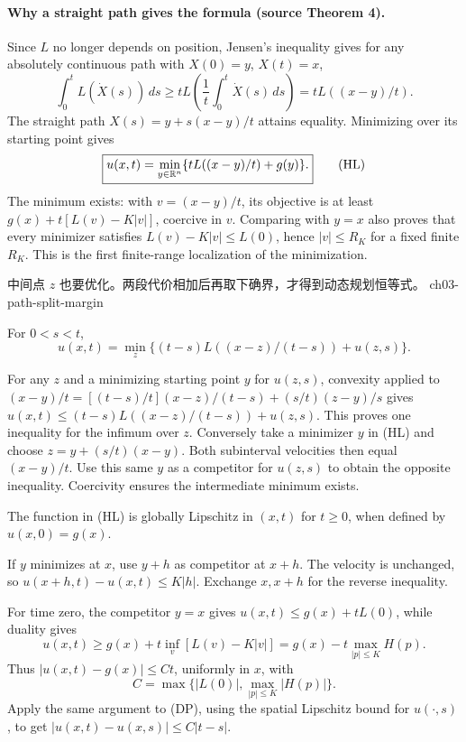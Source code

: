 \paragraph{Why a straight path gives the formula (source Theorem 4).}
Since $L$ no longer depends on position, Jensen's inequality gives
for any absolutely continuous path with $X(0)=y$, $X(t)=x$,
\[
 \int_0^tL(\dot X(s))\,ds
 \geq tL\left(\frac1t\int_0^t\dot X(s)\,ds\right)
 =tL((x-y)/t).
\]
The straight path $X(s)=y+s(x-y)/t$ attains equality.
Minimizing over its starting point gives
\[
 \boxed{u(x,t)=\min_{y\in\mathbb{R}^n}
             \{tL((x-y)/t)+g(y)\}.}
 \tag{HL}
\]
The minimum exists: with $v=(x-y)/t$, its objective is at least
$g(x)+t[L(v)-K|v|]$, coercive in $v$.
Comparing with $y=x$ also proves that every minimizer satisfies
$L(v)-K|v|\leq L(0)$, hence $|v|\leq R_K$ for a fixed finite $R_K$.
This is the first finite-range localization of the minimization.
\Needspace{45mm}


{中间点 $z$ 也要优化。两段代价相加后再取下确界，才得到动态规划恒等式。}
{ch03-path-split-margin}

\begin{lemma}\label{lem:3-dpp}
For $0<s<t$,
\[
 u(x,t)=\min_z\{(t-s)L((x-z)/(t-s))+u(z,s)\}.
 \tag{DP}
\]
\end{lemma}
\begin{expandedproof}
For any $z$ and a minimizing starting point $y$ for $u(z,s)$,
convexity applied to
$(x-y)/t=[(t-s)/t](x-z)/(t-s)+(s/t)(z-y)/s$
gives
$u(x,t)\leq(t-s)L((x-z)/(t-s))+u(z,s)$.
This proves one inequality for the infimum over $z$.
Conversely take a minimizer $y$ in (HL) and choose
$z=y+(s/t)(x-y)$. Both subinterval velocities then equal $(x-y)/t$.
Use this same $y$ as a competitor for $u(z,s)$ to obtain the opposite
inequality. Coercivity ensures the intermediate minimum exists.
\end{expandedproof}

\begin{lemma}
The function in (HL) is globally Lipschitz in $(x,t)$ for $t\geq0$,
when defined by $u(x,0)=g(x)$.
\end{lemma}
\begin{expandedproof}
If $y$ minimizes at $x$, use $y+h$ as competitor at $x+h$.
The velocity is unchanged, so $u(x+h,t)-u(x,t)\leq K|h|$.
Exchange $x,x+h$ for the reverse inequality.

For time zero, the competitor $y=x$ gives
$u(x,t)\leq g(x)+tL(0)$, while duality gives
\[
 u(x,t)\geq g(x)+t\inf_v[L(v)-K|v|]
 =g(x)-t\max_{|p|\leq K}H(p).
\]
Thus $|u(x,t)-g(x)|\leq Ct$, uniformly in $x$, with
\[
 C=\max\{|L(0)|,\max_{|p|\leq K}|H(p)|\}.
\]
Apply the same argument to (DP), using the spatial Lipschitz bound
for $u(\cdot,s)$, to get $|u(x,t)-u(x,s)|\leq C|t-s|$.
\end{expandedproof}


